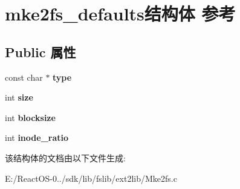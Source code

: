 \hypertarget{structmke2fs__defaults}{}\section{mke2fs\+\_\+defaults结构体 参考}
\label{structmke2fs__defaults}
\subsection*{Public 属性}
\begin{DoxyCompactItemize}
\item 
\mbox{\label{structmke2fs__defaults_a53bb3d71cece5d546cb082ecadd9eb14}} 
const char $\ast$ {\bfseries type}
\item 
\mbox{\label{structmke2fs__defaults_ab14f83e876c1f669a0107c67ab83bbad}} 
int {\bfseries size}
\item 
\mbox{\label{structmke2fs__defaults_abc75f3eff82a0d2f4b81291cd03cbd66}} 
int {\bfseries blocksize}
\item 
\mbox{\label{structmke2fs__defaults_ad0085cc1d9844c53468e02d70046e3ba}} 
int {\bfseries inode\+\_\+ratio}
\end{DoxyCompactItemize}


该结构体的文档由以下文件生成\+:\begin{DoxyCompactItemize}
\item 
E\+:/\+React\+O\+S-\/0../sdk/lib/fslib/ext2lib/Mke2fs.\+c\end{DoxyCompactItemize}
